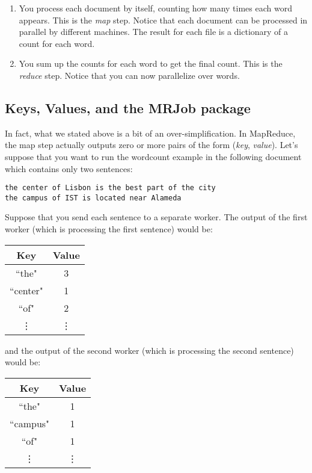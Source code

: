 \begin{enumerate}
\item You process each document by itself, counting how many times each word
appears. This is the \emph{map} step. Notice that each document can be
processed in parallel by different machines. The result for each file is a
dictionary of a count for each word.
\item You sum up the counts for each word to get the final count. This is the
\emph{reduce} step. Notice that you can now parallelize over words.
\end{enumerate}

\subsection{Keys, Values, and the MRJob package}
In fact, what we stated above is a bit of an over-simplification. In MapReduce, the map step actually outputs zero or more pairs of the form (\emph{key}, \emph{value}). Let's suppose that you want to run the wordcount example in the following document which contains only two sentences:

\begin{verbatim}
the center of Lisbon is the best part of the city
the campus of IST is located near Alameda
\end{verbatim}

Suppose that you send each sentence to a separate worker. The output of the first worker (which is processing the first sentence) would be:

\begin{center}
\begin{tabular}{|c|c|}
\hline
Key & Value \\
\hline\hline
``the" & 3 \\
``center" & 1 \\
``of" & 2\\
\vdots & \vdots \\
\end{tabular}
\end{center}

and the output of the second worker (which is processing the second sentence) would be:

\begin{center}
\begin{tabular}{|c|c|}
\hline
Key & Value \\
\hline\hline
``the" & 1 \\
``campus" & 1 \\
``of" & 1\\
\vdots & \vdots \\
\end{tabular}
\end{center}

